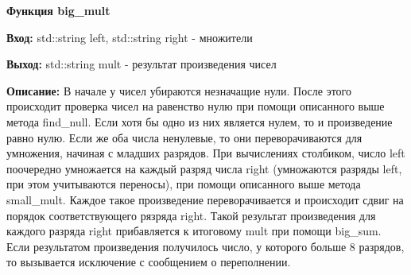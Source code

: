 \textbf{Функция big\_mult } \par
\textbf{Вход:} std::string left, std::string right - множители \par
\textbf{Выход:} std::string mult - результат произведения чисел\par
\textbf{Описание:} В начале у чисел убираются незначащие нули. После этого происходит проверка чисел на равенство нулю при помощи описанного выше метода find\_null. Если хотя бы одно из них является нулем, то и произведение равно нулю. Если же оба числа ненулевые, то они переворачиваются для умножения, начиная с младших разрядов. При вычислениях столбиком, число left поочередно умножается на каждый разряд числа right (умножаются разряды left, при этом учитываются переносы), при помощи описанного выше метода small\_mult. Каждое такое произведение переворачивается и происходит сдвиг на порядок соответствующего рязряда right. Такой результат произведения для каждого разряда right прибавляется к итоговому mult при помощи big\_sum. Если результатом произведения получилось число, у которого больше 8 разрядов, то вызывается исключение с сообщением о переполнении. \par
\vspace{10pt}

